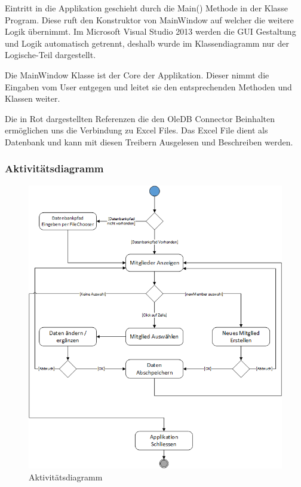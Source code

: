 \documentclass{article}
\begin{document}
Eintritt in die Applikation geschieht durch die Main() Methode in der Klasse Program. Diese ruft den Konstruktor von MainWindow auf welcher die weitere Logik übernimmt. Im Microsoft Visual Studio 2013 werden die GUI Gestaltung und Logik automatisch getrennt, deshalb wurde im Klassendiagramm nur der Logische-Teil dargestellt.

Die MainWindow Klasse ist der Core der Applikation. Dieser nimmt die Eingaben vom User entgegen und leitet sie den entsprechenden Methoden und Klassen weiter. 

Die in Rot dargestellten Referenzen die den OleDB Connector Beinhalten ermöglichen uns die Verbindung zu Excel Files. Das Excel File dient als Datenbank und kann mit diesen Treibern Ausgelesen und Beschreiben werden.

\newpage


\subsubsection{Aktivitätsdiagramm}
\begin{figure}[h]
	\centering
	\includegraphics[width=0.9 \textwidth]{Aktivtaetsdiagramm}
	\caption{Aktivitätsdiagramm}
\end{figure}
\end{document}
